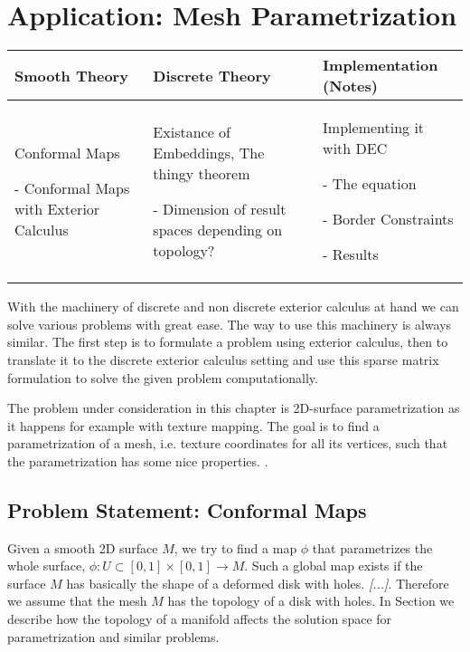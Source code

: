 \chapter{Application: Mesh Parametrization}
	\begin{longtable}{|p{4.5cm}|p{4.5cm}|p{4.5cm}|}
		\hline
		Smooth Theory& Discrete Theory& Implementation (Notes)\\
		\hline
			Conformal Maps
			\begin{packed_enum}
				\item[-] Conformal Maps with Exterior Calculus
			\end{packed_enum}
			&
			Existance of Embeddings, The thingy theorem
			\begin{packed_enum}
				\item[-] Dimension of result spaces depending on topology?
			\end{packed_enum}
			 & 
			 Implementing it with DEC
			 \begin{packed_enum}
				\item[-] The equation
				\item[-] Border Constraints
				\item[-] Results
			\end{packed_enum}
			 \\		
		\hline
	\end{longtable}
	
With the machinery of discrete and non discrete exterior calculus at hand we can solve various problems with great ease. The way to use this machinery is always similar. The first step is to formulate a problem using exterior calculus, then to translate it to the discrete exterior calculus setting and use this sparse matrix formulation to solve the given problem computationally.

The problem under consideration in this chapter is 2D-surface parametrization as it happens for example with texture mapping. The goal is to find a parametrization of a mesh, i.e. texture coordinates for all its vertices, such that the parametrization has some nice properties.  . 


	\section{Problem Statement: Conformal Maps}
	Given a smooth 2D surface $M$, we try to find a map $\phi$ that parametrizes the whole surface, $\phi: U \subset [0,1]\times [0,1] \rightarrow M$. Such a global map exists if the surface $M$ has basically the shape of a deformed disk with holes. \emph{[...]}. Therefore we assume that the mesh $M$ has the topology of a disk with holes. In Section  we describe how the topology of a manifold affects the solution space for parametrization and similar problems.
	
